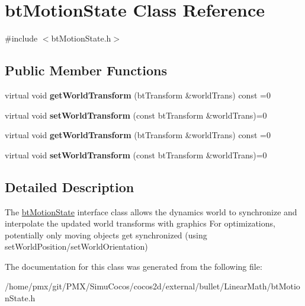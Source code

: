\hypertarget{classbtMotionState}{}\section{bt\+Motion\+State Class Reference}
\label{classbtMotionState}


{\ttfamily \#include $<$bt\+Motion\+State.\+h$>$}

\subsection*{Public Member Functions}
\begin{DoxyCompactItemize}
\item 
\mbox{\label{classbtMotionState_a5d30ed64161a4f36fe2affc3d3501412}} 
virtual void {\bfseries get\+World\+Transform} (bt\+Transform \&world\+Trans) const =0
\item 
\mbox{\label{classbtMotionState_afde01598075a93ef42ebb1493a2bf6fc}} 
virtual void {\bfseries set\+World\+Transform} (const bt\+Transform \&world\+Trans)=0
\item 
\mbox{\label{classbtMotionState_a5d30ed64161a4f36fe2affc3d3501412}} 
virtual void {\bfseries get\+World\+Transform} (bt\+Transform \&world\+Trans) const =0
\item 
\mbox{\label{classbtMotionState_afde01598075a93ef42ebb1493a2bf6fc}} 
virtual void {\bfseries set\+World\+Transform} (const bt\+Transform \&world\+Trans)=0
\end{DoxyCompactItemize}


\subsection{Detailed Description}
The \hyperlink{classbtMotionState}{bt\+Motion\+State} interface class allows the dynamics world to synchronize and interpolate the updated world transforms with graphics For optimizations, potentially only moving objects get synchronized (using set\+World\+Position/set\+World\+Orientation) 

The documentation for this class was generated from the following file\+:\begin{DoxyCompactItemize}
\item 
/home/pmx/git/\+P\+M\+X/\+Simu\+Cocos/cocos2d/external/bullet/\+Linear\+Math/bt\+Motion\+State.\+h\end{DoxyCompactItemize}

